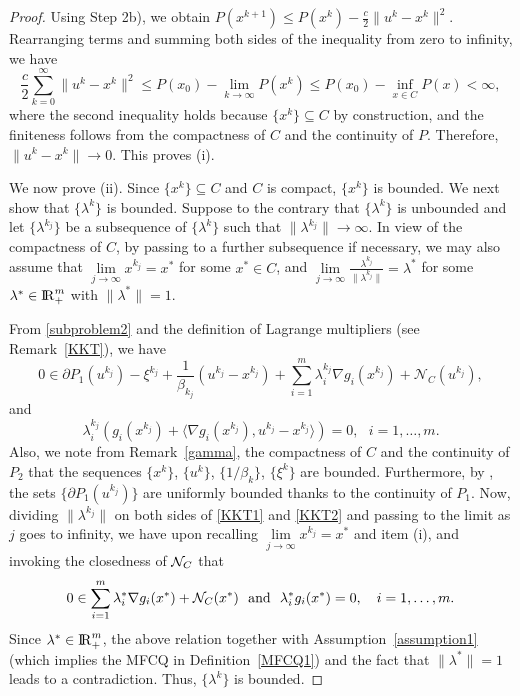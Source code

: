 \documentclass[10pt]{article}
\numberwithin{equation}{section}
\def\R{{\rm I\!R}}
\begin{document}
\begin{proof}
Using Step 2b), we obtain $P(x^{k+1}) \leq P(x^k) - \frac{c}{2}\|u^k - x^k\|^2$. Rearranging terms and summing both sides of the inequality from zero to infinity, we have
\[
\frac{c}{2}\sum_{k=0}^\infty\|u^k - x^k\|^2\leq P(x_0) - \lim\limits_{k\rightarrow\infty} P(x^k)\leq P(x_0) - \inf\limits_{x\in C} P(x) < \infty,
\]
where the second inequality holds because $\{x^k\}\subseteq C$ by construction, and the finiteness follows from the compactness of $C$ and the continuity of $P$. Therefore, $\|u^k - x^k\|\rightarrow 0$. This proves (i).

We now prove (ii). Since $\{x^k\}\subseteq C$ and $C$ is compact, $\{x^k\}$ is bounded. We next show that $\{\lambda^k\}$ is bounded. Suppose to the contrary that $\{\lambda^k\}$ is unbounded and let $\{\lambda^{k_j}\}$ be a subsequence of $\{\lambda^k\}$ such that $\|\lambda^{k_j}\|\rightarrow \infty$. In view of the compactness of $C$, by passing to a further subsequence if necessary, we may also assume that $\lim\limits_{j\rightarrow\infty}x^{k_j} = x^*$ for some $x^*\in C$, and $\lim\limits_{j\rightarrow\infty}\frac{\lambda^{k_j}}{\|\lambda^{k_j}\|} = \lambda^*$ for some $\lambda^*\in\R^m_+$ with $\|\lambda^*\| = 1$.

From \eqref{subproblem2} and the definition of Lagrange multipliers (see Remark~\ref{KKT}), we have
\begin{equation}\label{KKT1}
0\in \partial P_1(u^{k_j}) -\xi^{k_j} + \frac{1}{\beta_{k_j}}(u^{k_j} - x^{k_j}) + \sum\limits_{i=1}^m\lambda^{k_j}_i\nabla g_i(x^{k_j}) +\mathcal{N}_C(u^{k_j}),
\end{equation}
and
\begin{equation}\label{KKT2}
\lambda^{k_j}_i (g_i(x^{k_j}) + \langle \nabla g_i(x^{k_j}), u^{k_j} - x^{k_j}\rangle) = 0,\ \ \  i = 1, \ldots, m.
\end{equation}
Also, we note from Remark~\ref{gamma}, the compactness of $C$ and the continuity of $P_2$ that the sequences $\{x^k\}$, $\{u^k\}$, $\{1/\beta_{k}\}$, $\{\xi^{k}\}$ are bounded. Furthermore, by \cite[Theorem~24.7]{Ro70}, the sets $\{\partial P_1(u^{k_j})\}$ are uniformly bounded thanks to the continuity of $P_1$. Now, dividing $\|\lambda^{k_j}\|$ on both sides of \eqref{KKT1} and \eqref{KKT2} and passing to the limit as $j$ goes to infinity, we have upon recalling $\lim\limits_{j\rightarrow\infty}x^{k_j} = x^*$ and item (i), and invoking the closedness of ${\cal N}_C$ that
\begin{equation*}
0\in \sum\limits_{i=1}^m \lambda^*_i\nabla g_i(x^*) + \mathcal{N}_C(x^*)\ \ {\rm and}\ \ \lambda^*_ig_i(x^*) = 0,\ \ \ i = 1, \ldots, m.
\end{equation*}
Since $\lambda^*\in\R^m_+$, the above relation together with Assumption~\ref{assumption1} (which implies the MFCQ in Definition~\ref{MFCQ1}) and the fact that $\|\lambda^*\|=1$ leads to a contradiction. Thus, $\{\lambda^k\}$ is bounded.


\end{proof}
\end{document}
